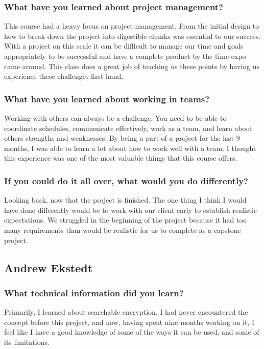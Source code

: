 \subsubsection{What have you learned about project management?}
This course had a heavy focus on project management. From the initial design to how to break down the project into digestible chunks was essential to our success. With a project on this scale it can be difficult to manage our time and goals appropriately to be successful and have a complete product by the time expo came around. This class does a great job of teaching us these points by having us experience these challenges first hand.

\subsubsection{What have you learned about working in teams?}
Working with others can always be a challenge. You need to be able to coordinate schedules, communicate effectively, work as a team, and learn about others strengths and weaknesses. By being a part of a project for the last 9 months, I was able to learn a lot about how to work well with a team. I thought this experience was one of the most valuable things that this course offers.

\subsubsection{If you could do it all over, what would you do differently?}
Looking back, now that the project is finished. The one thing I think I would have done differently would be to work with our client early to establish realistic expectations. We struggled in the beginning of the project because it had too many requirements than would be realistic for us to complete as a capstone project.

\subsection{Andrew Ekstedt}
\subsubsection{What technical information did you learn?}

Primarily, I learned about searchable encryption. I had never encountered the concept before this project, and now, having spent nine months working on it, I feel like I have a good knowledge of some of the ways it can be used, and some of its limitations. 

